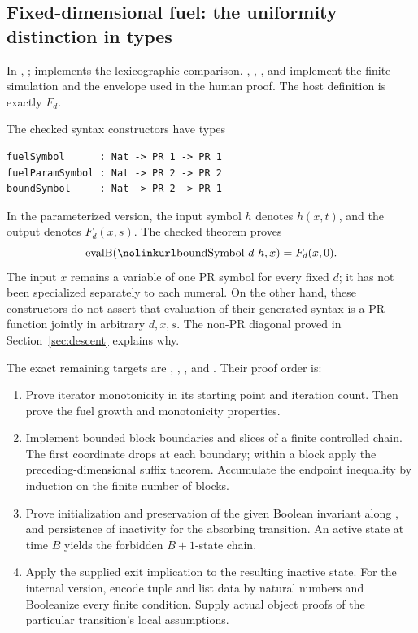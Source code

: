 \subsection{Fixed-dimensional fuel: the uniformity distinction in types}

In ,
;  implements the
lexicographic comparison. , ,
, and  implement the finite
simulation and the envelope used in the human proof. The host
 definition is exactly \(F_d\).

The checked syntax constructors have types
\begin{lstlisting}
fuelSymbol      : Nat -> PR 1 -> PR 1
fuelParamSymbol : Nat -> PR 2 -> PR 2
boundSymbol     : Nat -> PR 2 -> PR 1
\end{lstlisting}
In the parameterized version, the input symbol \(h\) denotes
\(h(x,t)\), and the output denotes \(F_d(x,s)\). The checked theorem
 proves
\[
 \operatorname{evalB}(\code{boundSymbol}\ d\ h,x)
       =F_d(x,0).
\]
The input \(x\) remains a variable of one PR symbol for every fixed
\(d\); it has not been specialized separately to each numeral.
On the other hand, these constructors do not assert that evaluation of
their generated syntax is a PR function jointly in arbitrary \(d,x,s\).
The non-PR diagonal proved in Section~\ref{sec:descent} explains why.

The exact remaining targets are ,
, ,
and . Their proof order is:

\begin{enumerate}
\item Prove iterator monotonicity in its starting point and iteration
count. Then prove the fuel growth and monotonicity properties.
\item Implement bounded block boundaries and slices of a finite
controlled chain. The first coordinate drops at each boundary;
within a block apply the preceding-dimensional suffix theorem.
Accumulate the endpoint inequality by induction on the finite number
of blocks.
\item Prove initialization and preservation of the given Boolean
invariant along , and persistence of inactivity for the
absorbing transition. An active state at time \(B\) yields the
forbidden \(B+1\)-state chain.
\item Apply the supplied exit implication to the resulting inactive
state. For the internal version, encode tuple and list data by
natural numbers and Booleanize every finite condition. Supply actual
object proofs of the particular transition's local assumptions.
\end{enumerate}

